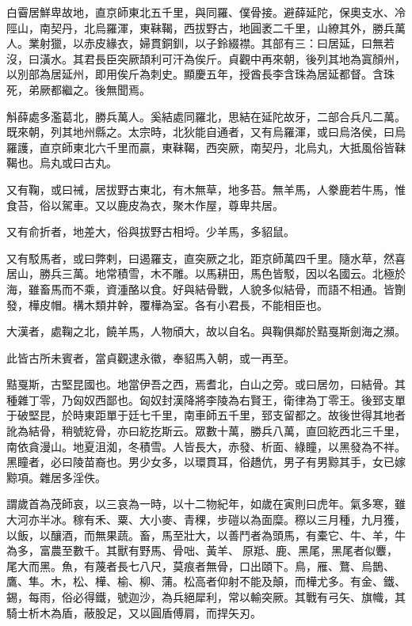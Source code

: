 \begin{pinyinscope}
 白霫居鮮卑故地，直京師東北五千里，與同羅、僕骨接。避薛延陀，保奧支水、冷陘山，南契丹，北烏羅渾，東靺鞨，西拔野古，地圓袤二千里，山繚其外，勝兵萬人。業射獵，以赤皮緣衣，婦貫銅釧，以子鈴綴襟。其部有三：曰居延，曰無若沒，曰潢水。其君長臣突厥頡利可汗為俟斤。貞觀中再來朝，後列其地為寘顏州，以別部為居延州，即用俟斤為刺史。顯慶五年，授酋長李含珠為居延都督。含珠死，弟厥都繼之。後無聞焉。



 斛薛處多濫葛北，勝兵萬人。奚結處同羅北，思結在延陀故牙，二部合兵凡二萬。既來朝，列其地州縣之。太宗時，北狄能自通者，又有烏羅渾，或曰烏洛侯，曰烏羅護，直京師東北六千里而贏，東靺鞨，西突厥，南契丹，北烏丸，大抵風俗皆靺鞨也。烏丸或曰古丸。



 又有鞠，或曰祴，居拔野古東北，有木無草，地多苔。無羊馬，人豢鹿若牛馬，惟食苔，俗以駕車。又以鹿皮為衣，聚木作屋，尊卑共居。



 又有俞折者，地差大，俗與拔野古相埒。少羊馬，多貂鼠。



 又有駁馬者，或曰弊剌，曰遏羅支，直突厥之北，距京師萬四千里。隨水草，然喜居山，勝兵三萬。地常積雪，木不雕。以馬耕田，馬色皆駁，因以名國云。北極於海，雖畜馬而不乘，資湩酪以食。好與結骨戰，人貌多似結骨，而語不相通。皆劗發，樺皮帽。構木類井幹，覆樺為室。各有小君長，不能相臣也。



 大漢者，處鞠之北，饒羊馬，人物頎大，故以自名。與鞠俱鄰於黠戛斯劍海之瀕。



 此皆古所未賓者，當貞觀逮永徽，奉貂馬入朝，或一再至。



 黠戛斯，古堅昆國也。地當伊吾之西，焉耆北，白山之旁。或曰居勿，曰結骨。其種雜丁零，乃匈奴西鄙也。匈奴封漢降將李陵為右賢王，衛律為丁零王。後郅支單于破堅昆，於時東距單于廷七千里，南車師五千里，郅支留都之。故後世得其地者訛為結骨，稍號紇骨，亦曰紇扢斯云。眾數十萬，勝兵八萬，直回紇西北三千里，南依貪漫山。地夏沮洳，冬積雪。人皆長大，赤發、析面、綠瞳，以黑發為不祥。黑瞳者，必曰陵苗裔也。男少女多，以環貫耳，俗趫伉，男子有男黥其手，女已嫁黥項。雜居多淫佚。



 謂歲首為茂師哀，以三哀為一時，以十二物紀年，如歲在寅則曰虎年。氣多寒，雖大河亦半冰。稼有禾、粟、大小麥、青稞，步磑以為面糜。穄以三月種，九月獲，以飯，以釀酒，而無果蔬。畜，馬至壯大，以善鬥者為頭馬，有橐它、牛、羊，牛為多，富農至數千。其獸有野馬、骨咄、黃羊、原羝、鹿、黑尾，黑尾者似麞，尾大而黑。魚，有蔑者長七八尺，莫痕者無骨，口出頤下。鳥，雁、鶩、烏鵲、鷹、隼。木，松、樺、榆、柳、蒲。松高者仰射不能及顛，而樺尤多。有金、鐵、錫，每雨，俗必得鐵，號迦沙，為兵絕犀利，常以輸突厥。其戰有弓矢、旗幟，其騎士析木為盾，蔽股足，又以圓盾傅肩，而捍矢刃。




\end{pinyinscope}
